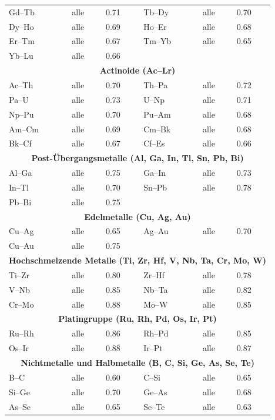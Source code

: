 \documentclass[12pt,a4paper]{article}
\begin{document}
\begin{longtable}{p{2.5cm} p{2.5cm} p{1.2cm} p{2.5cm} p{2.5cm} p{1.2cm}}
		Gd–Tb & alle & 0.71 & Tb–Dy & alle & 0.70 \\
		Dy–Ho & alle & 0.69 & Ho–Er & alle & 0.68 \\
		Er–Tm & alle & 0.67 & Tm–Yb & alle & 0.65 \\
		Yb–Lu & alle & 0.66 & & & \\
		\multicolumn{6}{c}{\textbf{Actinoide (Ac–Lr)}} \\
		Ac–Th & alle & 0.70 & Th–Pa & alle & 0.72 \\
		Pa–U  & alle & 0.73 & U–Np & alle & 0.71 \\
		Np–Pu & alle & 0.70 & Pu–Am & alle & 0.68 \\
		Am–Cm & alle & 0.69 & Cm–Bk & alle & 0.68 \\
		Bk–Cf & alle & 0.67 & Cf–Es & alle & 0.66 \\
		\multicolumn{6}{c}{\textbf{Post-Übergangsmetalle (Al, Ga, In, Tl, Sn, Pb, Bi)}} \\
		Al–Ga & alle & 0.75 & Ga–In & alle & 0.73 \\
		In–Tl & alle & 0.70 & Sn–Pb & alle & 0.78 \\
		Pb–Bi & alle & 0.75 & & & \\
		\multicolumn{6}{c}{\textbf{Edelmetalle (Cu, Ag, Au)}} \\
		Cu–Ag & alle & 0.65 & Ag–Au & alle & 0.70 \\
		Cu–Au & alle & 0.75 & & & \\
		\multicolumn{6}{c}{\textbf{Hochschmelzende Metalle (Ti, Zr, Hf, V, Nb, Ta, Cr, Mo, W)}} \\
		Ti–Zr & alle & 0.80 & Zr–Hf & alle & 0.78 \\
		V–Nb & alle & 0.85 & Nb–Ta & alle & 0.82 \\
		Cr–Mo & alle & 0.88 & Mo–W & alle & 0.85 \\
		\multicolumn{6}{c}{\textbf{Platingruppe (Ru, Rh, Pd, Os, Ir, Pt)}} \\
		Ru–Rh & alle & 0.86 & Rh–Pd & alle & 0.85 \\
		Os–Ir & alle & 0.88 & Ir–Pt & alle & 0.87 \\
		\multicolumn{6}{c}{\textbf{Nichtmetalle und Halbmetalle (B, C, Si, Ge, As, Se, Te)}} \\
		B–C  & alle & 0.60 & C–Si  & alle & 0.65 \\
		Si–Ge & alle & 0.70 & Ge–As & alle & 0.68 \\
		As–Se & alle & 0.65 & Se–Te & alle & 0.63 \\
		\bottomrule
	\end{longtable}
	
\end{document}
